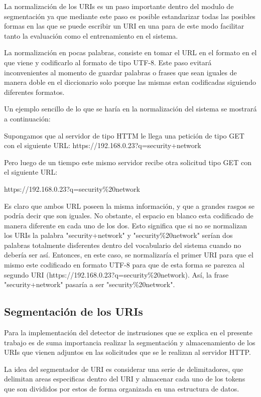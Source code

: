 La normalización de los URIs es un paso importante dentro del modulo de segmentación ya que mediante este paso es posible estandarizar todas las posibles formas en las que se puede escribir un URI en una para de este modo facilitar tanto la evaluación como el entrenamiento en el sistema.

La normalización en pocas palabras, consiste en tomar el URL en el formato en el que viene y codificarlo al formato de tipo UTF-8. Este paso evitará inconvenientes al momento de guardar palabras o frases que sean iguales de manera doble en el diccionario solo porque las mismas estan codificadas siguiendo diferentes formatos.

Un ejemplo sencillo de lo que se haría en la normalización del sistema se mostrará a continuación:

Supongamos que al servidor de tipo HTTM le llega una petición de tipo GET con el siguiente URL:
https://192.168.0.23?q=security+network

Pero luego de un tiempo este mismo servidor recibe otra solicitud tipo GET con el siguiente URL:

https://192.168.0.23?q=security\%20network

Es claro que ambos URL poseen la misma información, y que a grandes rasgos se podría decir que son iguales. No obstante, el espacio en blanco esta codificado de manera diferente en cada uno de los dos. Esto significa que si no se normalizan los URIs la palabra "security+network" y "security\%20network" serían dos palabras totalmente disferentes dentro del vocabulario del sistema cuando no debería ser así. Entonces, en este caso, se normalizaría el primer URI para que el mismo este codificado en formato UTF-8 para que de esta forma se parezca al segundo URI (https://192.168.0.23?q=security\%20network). Así, la frase "security+network" pasaría a ser  "security\%20network".


\subsection{Segmentación de los URIs}

Para la implementación del detector de instrusiones que se explica en el presente trabajo es de suma importancia realizar la segmentación y almacenamiento de los URIs que vienen adjuntos en las solicitudes que se le realizan al servidor HTTP. 

La idea del segmentador de URI es considerar una serie de delimitadores, que delimitan areas especificas dentro del URI y almacenar cada uno de los tokens que son divididos por estos de forma organizada en una estructura de datos.

